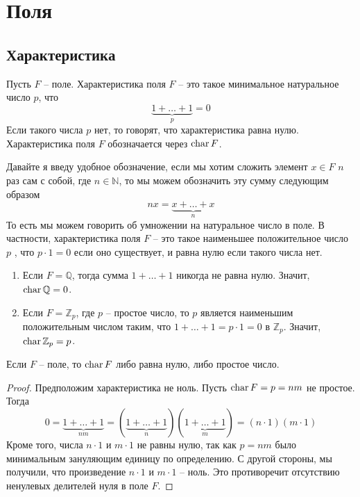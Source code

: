 \section{Поля}

\subsection{Характеристика}

\begin{definition}
Пусть $F$ -- поле.
Характеристика поля $F$ -- это такое минимальное натуральное число $p$, что
\[
\underbrace{1+\ldots + 1}_p = 0
\]
Если такого числа $p$ нет, то говорят, что характеристика равна нулю.
Характеристика поля $F$ обозначается через $\operatorname{char} F$.
\end{definition}

Давайте я введу удобное обозначение, если мы хотим сложить элемент $x\in F$ $n$ раз сам с собой, где $n\in \mathbb N$, то мы можем обозначить эту сумму следующим образом
\[
n x = \underbrace{x+\ldots + x}_n
\]
То есть мы можем говорить об умножении на натуральное число в поле.
В частности, характеристика поля $F$ -- это такое наименьшее положительное число $p$ , что $p \cdot 1 = 0$ если оно существует, и равна нулю если такого числа нет.

\begin{examples}
\begin{enumerate}
\item Если $F = \mathbb Q$, тогда сумма $1+\ldots + 1$ никогда не равна нулю.
Значит, $\operatorname{char} \mathbb Q = 0$.

\item Если $F = \mathbb Z_p$, где $p$ -- простое число, то $p$ является наименьшим положительным числом таким, что $1 + \ldots + 1 = p \cdot 1 = 0$ в $\mathbb Z_p$.
Значит, $\operatorname{char} \mathbb Z_p = p$.
\end{enumerate}
\end{examples}

\begin{claim}
Если $F$ -- поле, то $\operatorname{char} F$ либо равна нулю, либо простое число.
\end{claim}
\begin{proof}
Предположим характеристика не ноль.
Пусть $\operatorname{char} F = p = n m$ не простое.
Тогда
\[
0 = \underbrace{1+\ldots + 1}_{nm} = (\underbrace{1+\ldots + 1}_{n})(\underbrace{1+\ldots + 1}_{m}) = (n \cdot 1) (m \cdot 1)
\]
Кроме того, числа $n\cdot 1$ и $m\cdot 1$ не равны нулю, так как $p = nm$ было минимальным зануляющим единицу по определению.
С другой стороны, мы получили, что произведение $n\cdot 1$ и $m \cdot 1$ -- ноль.
Это противоречит отсутствию ненулевых делителей нуля в поле $F$.
\end{proof}

